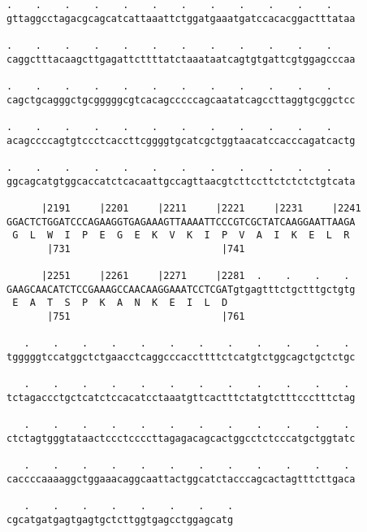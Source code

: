 \documentclass{article}
\begin{document}
\begin{Verbatim}
.    .    .    .    .    .    .    .    .    .    .    .    
gttaggcctagacgcagcatcattaaattctggatgaaatgatccacacggactttataa
                                                            
.    .    .    .    .    .    .    .    .    .    .    .    
caggctttacaagcttgagattcttttatctaaataatcagtgtgattcgtggagcccaa
                                                            
.    .    .    .    .    .    .    .    .    .    .    .    
cagctgcagggctgcgggggcgtcacagcccccagcaatatcagccttaggtgcggctcc
                                                            
.    .    .    .    .    .    .    .    .    .    .    .    
acagccccagtgtccctcaccttcggggtgcatcgctggtaacatccacccagatcactg
                                                            
.    .    .    .    .    .    .    .    .    .    .    .    
ggcagcatgtggcaccatctcacaattgccagttaacgtcttccttctctctctgtcata
                                                            
      |2191     |2201     |2211     |2221     |2231     |2241
GGACTCTGGATCCCAGAAGGTGAGAAAGTTAAAATTCCCGTCGCTATCAAGGAATTAAGA
 G  L  W  I  P  E  G  E  K  V  K  I  P  V  A  I  K  E  L  R 
       |731                          |741                   
  
      |2251     |2261     |2271     |2281  .    .    .    . 
GAAGCAACATCTCCGAAAGCCAACAAGGAAATCCTCGATgtgagtttctgctttgctgtg
 E  A  T  S  P  K  A  N  K  E  I  L  D                      
       |751                          |761                   
  
   .    .    .    .    .    .    .    .    .    .    .    . 
tgggggtccatggctctgaacctcaggcccaccttttctcatgtctggcagctgctctgc
                                                            
   .    .    .    .    .    .    .    .    .    .    .    . 
tctagaccctgctcatctccacatcctaaatgttcactttctatgtctttccctttctag
                                                            
   .    .    .    .    .    .    .    .    .    .    .    . 
ctctagtgggtataactccctccccttagagacagcactggcctctcccatgctggtatc
                                                            
   .    .    .    .    .    .    .    .    .    .    .    . 
caccccaaaaggctggaaacaggcaattactggcatctacccagcactagtttcttgaca
                                                            
   .    .    .    .    .    .    .    .
cgcatgatgagtgagtgctcttggtgagcctggagcatg
                                       

\end{Verbatim}
\end{document}
